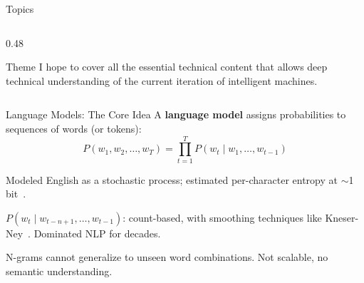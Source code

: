 \begin{frame}{Topics}
\begin{columns}
\begin{column}{0.48\textwidth}
  \begin{alertblock}{Theme}
	  I hope to cover all the essential technical content that allows deep technical understanding of the current iteration of intelligent machines.
  \end{alertblock}
    \end{column}
  \end{columns}
\end{frame}


\begin{frame}{Language Models: The Core Idea}
  A \textbf{language model} assigns probabilities to sequences of words (or tokens):
  \[
    P(w_1, w_2, \ldots, w_T) = \prod_{t=1}^{T} P(w_t \mid w_1, \ldots, w_{t-1})
  \]

  \begin{description}[style=nextline]
    \item[Claude Shannon (1951)] Modeled English as a stochastic process; estimated per-character entropy at $\sim$1 bit~\cite{shannon1951prediction}.
    \item[N-gram models] $P(w_t \mid w_{t-n+1}, \ldots, w_{t-1})$: count-based, with smoothing techniques like Kneser-Ney~\cite{kneser1995smoothing}. Dominated NLP for decades.
    \item[Fundamental limitation] N-grams cannot generalize to unseen word combinations. Not scalable, no semantic understanding.
  \end{description}
\end{frame}

